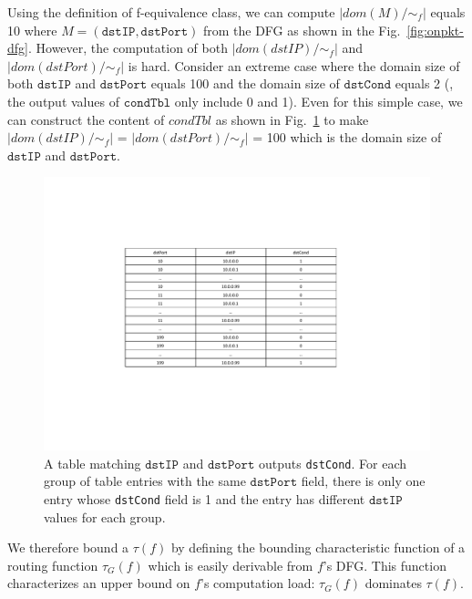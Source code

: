 Using the definition of f-equivalence class, we can compute $|dom(M)/\sim_f|$ equals 10 where $M = (\texttt{dstIP}, \texttt{dstPort})$ from the DFG as shown in the Fig.~\ref{fig:onpkt-dfg}. However, the computation of both $|dom(dstIP)/\sim_f|$ and $|dom(dstPort)/\sim_f|$ is hard. Consider an extreme case where the domain size of both $\texttt{dstIP}$ and $\texttt{dstPort}$ equals 100 and the domain size of $\texttt{dstCond}$ equals 2 (\ie, the output values of $\texttt{condTbl}$ only include 0 and 1). Even for this simple case, we can construct the content of $condTbl$ as shown in Fig.~\ref{fig:table-example} to make $|dom(dstIP)/\sim_f|$ = $|dom(dstPort)/\sim_f|$ = 100 which is the domain size of $\texttt{dstIP}$ and $\texttt{dstPort}$.

\begin{figure}[tbh]
    \centering
    \vspace{-1mm}
    \includegraphics[scale = 0.6]{figures/figure-table-example.pdf}
    \vspace{-2mm}
    \caption{A table matching $\texttt{dstIP}$ and $\texttt{dstPort}$ outputs \texttt{dstCond}. For each group of table entries with the same $\texttt{dstPort}$ field, there is only one entry whose \texttt{dstCond} field is 1 and the entry has different $\texttt{dstIP}$ values for each group.}
    \label{fig:table-example}
    \vspace{-2mm}
\end{figure}

We therefore bound a $\tau(f)$ by defining the bounding characteristic function of a routing function $\tau_G(f)$ which is easily derivable from $f$'s DFG. This function characterizes an upper bound on $f$'s computation load: $\tau_G(f)$ dominates $\tau(f)$.

